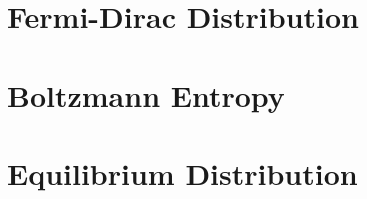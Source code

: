 \documentclass[10pt]{report}
\begin{document}
\section*{Fermi-Dirac Distribution}
\clearpage

\section*{Boltzmann Entropy}
\clearpage

\section*{Equilibrium Distribution}
\clearpage
\printbibliography
\end{document}
